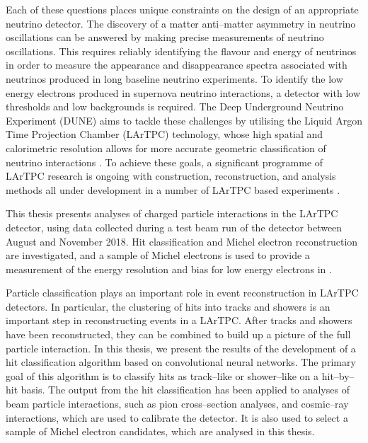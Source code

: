 Each of these questions places unique constraints on the design of an
appropriate neutrino detector. The discovery of a matter anti--matter asymmetry
in neutrino oscillations can be answered by making precise measurements of
neutrino oscillations. This requires reliably identifying the flavour and energy
of neutrinos in order to measure the appearance and disappearance spectra
associated with neutrinos produced in long baseline neutrino experiments. To
identify the low energy electrons produced in supernova neutrino interactions, a
detector with low thresholds and low backgrounds is required. The Deep
Underground Neutrino Experiment (DUNE) aims to tackle these challenges by
utilising the Liquid Argon Time Projection Chamber (LArTPC) technology, whose
high spatial and calorimetric resolution allows for more accurate geometric
classification of neutrino interactions \cite{Acciarri:2016crz}. To achieve
these goals, a significant programme of LArTPC research is ongoing with
construction, reconstruction, and analysis methods all under development in a
number of LArTPC based experiments \cite{Acciarri:2016smi, Cavanna:2014iqa,
Antonello:2015lea, Abi:2017aow}. 

This thesis presents analyses of charged particle interactions in the
\protodune{} LArTPC detector, using data collected during a test beam run of the
detector between August and November 2018. Hit classification and Michel 
electron reconstruction are investigated, and a sample of Michel electrons is 
used to provide a measurement of the energy resolution and bias for low energy 
electrons in \protodune{}.

Particle classification plays an important role in event reconstruction in 
LArTPC detectors. In particular, the clustering of hits into tracks and 
showers is an important step in reconstructing events in a LArTPC. After tracks
and showers have been reconstructed, they can be combined to build up a picture
of the full particle interaction. In this thesis, we present the results of the 
development of a hit classification algorithm based on convolutional neural
networks. The primary goal of this algorithm is to classify hits as 
track--like or shower--like on a hit--by--hit basis. The output from the hit 
classification has been applied to analyses of beam particle interactions, 
such as pion cross--section analyses, and cosmic--ray interactions, which 
are used to calibrate the \protodune{} detector. It is also used to select a 
sample of Michel electron candidates, which are analysed in this thesis.

